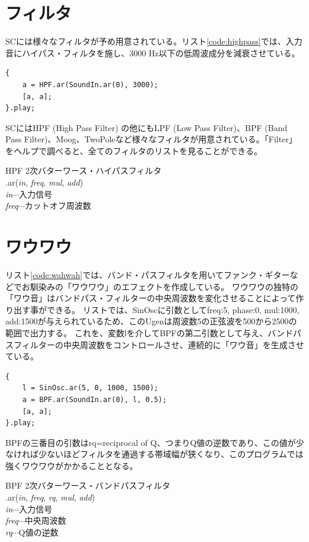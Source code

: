 \documentclass{jsarticle}
\begin{document}
\section{フィルタ}
SCには様々なフィルタが予め用意されている。リスト\ref{code:highpass}では、入力音にハイパス・フィルタを施し、3000 Hz以下の低周波成分を減衰させている。

\begin{lstlisting}[caption=ハイパス・フィルタ, label=code:highpass]
{
	a = HPF.ar(SoundIn.ar(0), 3000);
	[a, a];
}.play;
\end{lstlisting}

SCにはHPF (High Pass Filter) の他にもLPF (Low Pass Filter)、BPF (Band Pass Filter)、Moog、TwoPoleなど様々なフィルタが用意されている。「Filter」をヘルプで調べると、全てのフィルタのリストを見ることができる。

\begin{itembox}[l]{HPF}
{\footnotesize 
2次バターワース・ハイパスフィルタ\\
.ar({\it in}, {\it freq}, {\it mul}, {\it add})\\

{\it in}$\cdots$入力信号\\
{\it freq}$\cdots$カットオフ周波数\\
}
\end{itembox}

\section{ワウワウ}
リスト\ref{code:wahwah}では、バンド・パスフィルタを用いてファンク・ギターなどでお馴染みの「ワウワウ」のエフェクトを作成している。
ワウワウの独特の「ワウ音」はバンドパス・フィルターの中央周波数を変化させることによって作り出す事ができる。
リストでは、SinOscに引数としてfreq:5, phase:0, mul:1000, add:1500が与えられているため、このUgenは周波数5の正弦波を500から2500の範囲で出力する。
これを、変数lを介してBPFの第二引数として与え、バンドパスフィルターの中央周波数をコントロールさせ、連続的に「ワウ音」を生成させている。
\begin{lstlisting}[caption=ワウワウ, label=code:wahwah]
{
	l = SinOsc.ar(5, 0, 1000, 1500);
	a = BPF.ar(SoundIn.ar(0), l, 0.5);
	[a, a];
}.play;
\end{lstlisting}

BPFの三番目の引数はrq=reciprocal of Q、つまりQ値の逆数であり、この値が少なければ少ないほどフィルタを通過する帯域幅が狭くなり、このプログラムでは強くワウワウがかかることとなる。

\begin{itembox}[l]{BPF}
{\footnotesize 
2次バターワース・バンドパスフィルタ\\
.ar({\it in}, {\it freq}, {\it rq}, {\it mul}, {\it add})\\

{\it in}$\cdots$入力信号\\
{\it freq}$\cdots$中央周波数\\
{\it rq}$\cdots$Q値の逆数\\
}
\end{itembox}
\end{document}
